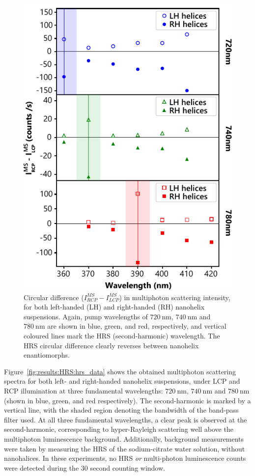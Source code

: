 \begin{figure}[htb!]	
    \centering	
    \includegraphics[scale=1]{./figures/results/HRS/hrs_cd_data.pdf}
    \caption{\label{fig:results:HRS:hrs_cd_data}
    Circular difference ($I_{RCP}^{MS}-I_{LCP}^{MS}$) in multiphoton scattering intensity, for both left-handed (LH) and right-handed (RH) nanohelix suspensions. Again, pump wavelengths of $\SI{720}{\nano\m}$, $\SI{740}{\nano\m}$ and $\SI{780}{\nano\m}$ are shown in blue, green, and red, respectively, and vertical coloured lines mark the HRS (second-harmonic) wavelength. The HRS circular difference clearly reverses between nanohelix enantiomorphs.}	
\end{figure}

Figure~\ref{fig:results:HRS:hrs_data} shows the obtained multiphoton scattering spectra for both left- and right-handed nanohelix suspensions, under LCP and RCP illumination at three fundamental wavelengths: $\SI{720}{\nano\m}$, $\SI{740}{\nano\m}$ and $\SI{780}{\nano\m}$ (shown in blue, green, and red respectively). 
The second-harmonic is marked by a vertical line, with the shaded region denoting the bandwidth of the band-pass filter used. At all three fundamental wavelengths, a clear peak is observed at the second-harmonic, corresponding to hyper-Rayleigh scattering well above the multiphoton luminescence background. Additionally, background measurements were taken by measuring the HRS of the sodium-citrate water solution, without nanohalices. In these experiments, no HRS \textit{or} multi-photon luminescence counts were detected during the 30 second counting window.

